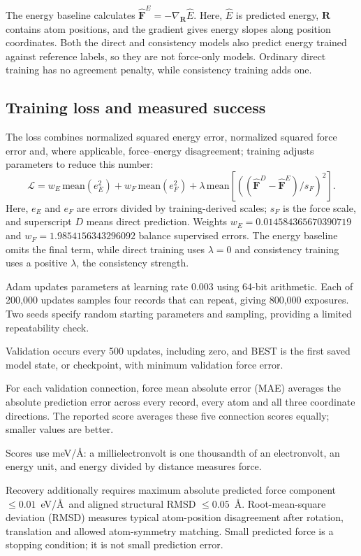 \documentclass{article}
\begin{document}
The energy baseline calculates $\widehat{\mathbf F}^{E}=-\nabla_{\mathbf R}\widehat E$. Here, $\widehat E$ is predicted energy, $\mathbf R$ contains atom positions, and the gradient gives energy slopes along position coordinates. Both the direct and consistency models also predict energy trained against reference labels, so they are not force-only models. Ordinary direct training has no agreement penalty, while consistency training adds one.
\subsection{Training loss and measured success}
The loss combines normalized squared energy error, normalized squared force error and, where applicable, force--energy disagreement; training adjusts parameters to reduce this number:
\begin{equation}
\mathcal L=w_E\,\mathrm{mean}(e_E^2)+w_F\,\mathrm{mean}(e_F^2)
+\lambda\,\mathrm{mean}\!\left[\left((\widehat{\mathbf F}^{D}-\widehat{\mathbf F}^{E})/s_F\right)^2\right].
\end{equation}
Here, $e_E$ and $e_F$ are errors divided by training-derived scales; $s_F$ is the force scale, and superscript $D$ means direct prediction. Weights $w_E=0.014584365670390719$ and $w_F=1.9854156343296092$ balance supervised errors. The energy baseline omits the final term, while direct training uses $\lambda=0$ and consistency training uses a positive $\lambda$, the consistency strength.

Adam updates parameters at learning rate 0.003 using 64-bit arithmetic. Each of 200,000 updates samples four records that can repeat, giving 800,000 exposures. Two seeds specify random starting parameters and sampling, providing a limited repeatability check.

Validation occurs every 500 updates, including zero, and BEST is the first saved model state, or checkpoint, with minimum validation force error.

For each validation connection, force mean absolute error (MAE) averages the absolute prediction error across every record, every atom and all three coordinate directions. The reported score averages these five connection scores equally; smaller values are better.

Scores use meV/\AA: a millielectronvolt is one thousandth of an electronvolt, an energy unit, and energy divided by distance measures force.

Recovery additionally requires maximum absolute predicted force component $\leq0.01$~eV/\AA\ and aligned structural RMSD $\leq0.05$~\AA. Root-mean-square deviation (RMSD) measures typical atom-position disagreement after rotation, translation and allowed atom-symmetry matching. Small predicted force is a stopping condition; it is not small prediction error.
\end{document}
